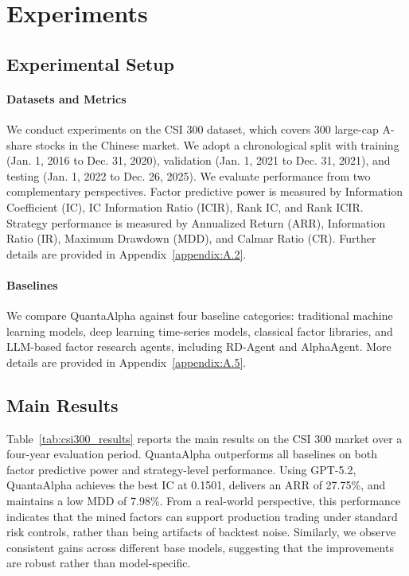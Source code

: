 \section{Experiments}


\subsection{Experimental Setup}

\paragraph{Datasets and Metrics} We conduct experiments on the CSI 300 dataset, which covers 300 large-cap A-share stocks in the Chinese market. We adopt a chronological split with training (Jan. 1, 2016 to Dec. 31, 2020), validation (Jan. 1, 2021 to Dec. 31, 2021), and testing (Jan. 1, 2022 to Dec. 26, 2025). We evaluate performance from two complementary perspectives. Factor predictive power is measured by Information Coefficient (IC), IC Information Ratio (ICIR), Rank IC, and Rank ICIR. Strategy performance is measured by Annualized Return (ARR), Information Ratio (IR), Maximum Drawdown (MDD), and Calmar Ratio (CR). Further details are provided in Appendix~\ref{appendix:A.2}.

\paragraph{Baselines} We compare QuantaAlpha against four baseline categories: traditional machine learning models, deep learning time-series models, classical factor libraries, and LLM-based factor research agents, including RD-Agent and AlphaAgent. More details are provided in Appendix~\ref{appendix:A.5}.

\subsection{Main Results}
Table~\ref{tab:csi300_results} reports the main results on the CSI 300 market over a four-year evaluation period. QuantaAlpha outperforms all baselines on both factor predictive power and strategy-level performance. Using GPT-5.2, QuantaAlpha achieves the best IC at 0.1501, delivers an ARR of 27.75\%, and maintains a low MDD of 7.98\%. From a real-world perspective, this performance indicates that the mined factors can support production trading under standard risk controls, rather than being artifacts of backtest noise. Similarly, we observe consistent gains across different base models, suggesting that the improvements are robust rather than model-specific.

